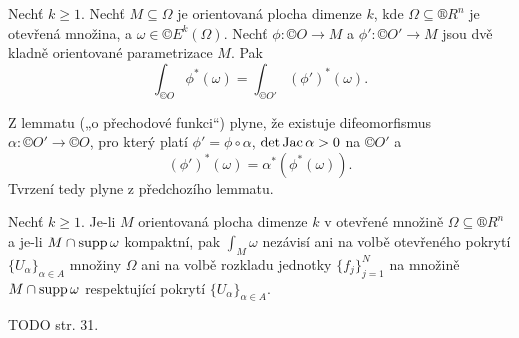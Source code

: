 \documentclass[12pt]{article}                   %
\begin{document}
        \begin{lemma}
            Nechť $k ≥ 1$. Nechť $M \subseteq \Omega$ je orientovaná plocha dimenze $k$, kde $\Omega \subseteq ®R^n$ je otevřená množina, a $\omega \in ©E^k(\Omega)$. Nechť $\phi: ©O \rightarrow M$ a $\phi': ©O' \rightarrow M$ jsou dvě kladně orientované parametrizace $M$. Pak
            $$ \int_{©O} \phi^*(\omega) = \int_{©O'} (\phi')^*(\omega). $$

            \begin{dukazin}
                Z lemmatu („o přechodové funkci“) plyne, že existuje difeomorfismus $\alpha: ©O' \rightarrow ©O$, pro který platí $\phi' = \phi \circ \alpha$, $\det \operatorname{Jac} \alpha > 0$ na $©O'$ a
                $$ (\phi')^*(\omega) = \alpha^*(\phi^*(\omega)). $$ 
                Tvrzení tedy plyne z předchozího lemmatu.
            \end{dukazin}
        \end{lemma}

        \begin{lemma}
            Nechť $k ≥ 1$. Je-li $M$ orientovaná plocha dimenze $k$ v otevřené množině $\Omega \subseteq ®R^n$ a je-li $M \cap \operatorname{supp} \omega$ kompaktní, pak $\int_M \omega$ nezávisí ani na volbě otevřeného pokrytí $\{U_\alpha\}_{\alpha \in A}$ množiny $\Omega$ ani na volbě rozkladu jednotky $\{f_j\}_{j=1}^N$ na množině $M \cap \operatorname{supp} \omega$ respektující pokrytí $\{U_\alpha\}_{\alpha \in A}$.

            \begin{dukazin}
                TODO str. 31.
            \end{dukazin}
        \end{lemma}
\end{document}
